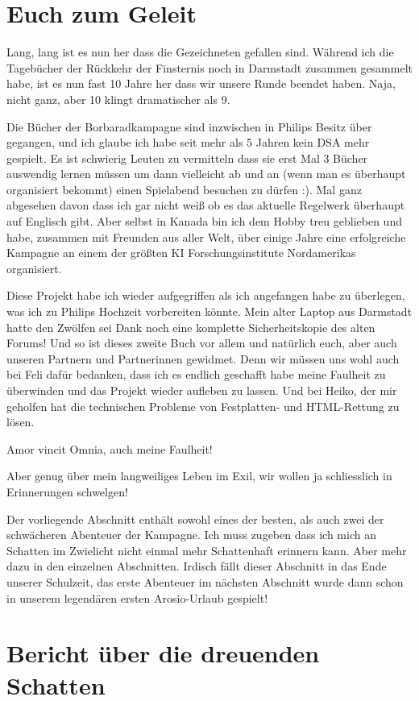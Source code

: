 \chapter{Euch zum Geleit}
Lang, lang ist es nun her dass die Gezeichneten gefallen sind. Während ich die Tagebücher der Rückkehr der Finsternis noch in Darmstadt zusammen gesammelt habe, ist es nun fast 10 Jahre her dass wir unsere Runde beendet haben. Naja, nicht ganz, aber 10 klingt dramatischer als 9.

Die Bücher der Borbaradkampagne sind inzwischen in Philips Besitz über gegangen, und ich glaube ich habe seit mehr als 5 Jahren kein DSA mehr gespielt. Es ist schwierig Leuten zu vermitteln dass sie erst Mal 3 Bücher auswendig lernen müssen um dann vielleicht ab und an (wenn man es überhaupt organisiert bekommt) einen Spielabend besuchen zu dürfen :). Mal ganz abgesehen davon dass ich gar nicht weiß ob es das aktuelle Regelwerk überhaupt auf Englisch gibt. Aber selbst in Kanada bin ich dem Hobby treu geblieben und habe, zusammen mit Freunden aus aller Welt, über einige Jahre eine erfolgreiche Kampagne an einem der größten KI Forschungsinstitute Nordamerikas organisiert. 

Diese Projekt habe ich wieder aufgegriffen als ich angefangen habe zu überlegen, was ich zu Philips Hochzeit vorbereiten könnte. Mein alter Laptop aus Darmstadt hatte den Zwölfen sei Dank noch eine komplette Sicherheitskopie des alten Forums! Und so ist dieses zweite Buch vor allem und natürlich euch, aber auch unseren Partnern und Partnerinnen gewidmet. Denn wir müssen uns wohl auch bei Feli dafür bedanken, dass ich es endlich geschafft habe meine Faulheit zu überwinden und das Projekt wieder aufleben zu lassen. Und bei Heiko, der mir geholfen hat die technischen Probleme von Festplatten- und HTML-Rettung zu lösen.

Amor vincit Omnia, auch meine Faulheit!

Aber genug über mein langweiliges Leben im Exil, wir wollen ja schliesslich in Erinnerungen schwelgen!

Der vorliegende Abschnitt enthält sowohl eines der besten, als auch zwei der schwächeren Abenteuer der Kampagne.
Ich muss zugeben dass ich mich an Schatten im Zwielicht nicht einmal mehr Schattenhaft erinnern kann. Aber mehr dazu in den einzelnen Abschnitten.
Irdisch fällt dieser Abschnitt in das Ende unserer Schulzeit, das erste Abenteuer im nächsten Abschnitt wurde dann schon in unserem legendären ersten Arosio-Urlaub gespielt!


\chapter{Bericht über die dreuenden Schatten}


